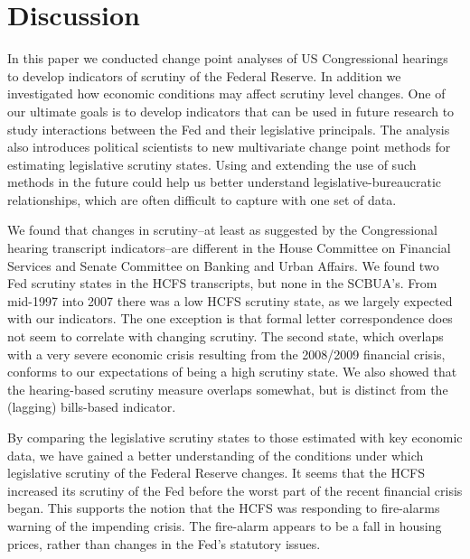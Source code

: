 \documentclass[a4paper]{article}\usepackage[]{graphicx}\usepackage[]{color}
\begin{document}
\section{Discussion}

In this paper we conducted change point analyses of US Congressional hearings to develop indicators of scrutiny of the Federal Reserve. In addition we investigated how economic conditions may affect scrutiny level changes. One of our ultimate goals is to develop indicators that can be used in future research to study interactions between the Fed and their legislative principals. The analysis also introduces political scientists to new multivariate change point methods for estimating legislative scrutiny states. Using and extending the use of such methods in the future could help us better understand legislative-bureaucratic relationships, which are often difficult to capture with one set of data.

We found that changes in scrutiny--at least as suggested by the Congressional hearing transcript indicators--are different in the House Committee on Financial Services and Senate Committee on Banking and Urban Affairs. We found two Fed scrutiny states in the HCFS transcripts, but none in the SCBUA's. From mid-1997 into 2007 there was a low HCFS scrutiny state, as we largely expected with our indicators. The one exception is that formal letter correspondence does not seem to correlate with changing scrutiny. The second state, which overlaps with a very severe economic crisis resulting from the 2008/2009 financial crisis, conforms to our expectations of being a high scrutiny state. We also showed that the hearing-based scrutiny measure overlaps somewhat, but is distinct from the (lagging) bills-based indicator.

By comparing the legislative scrutiny states to those estimated with key economic data, we have gained a better understanding of the conditions under which legislative scrutiny of the Federal Reserve changes. It seems that the HCFS increased its scrutiny of the Fed before the worst part of the recent financial crisis began. This supports the notion that the HCFS was responding to fire-alarms warning of the impending crisis. The fire-alarm appears to be a fall in housing prices, rather than changes in the Fed's statutory issues.




\end{document}
